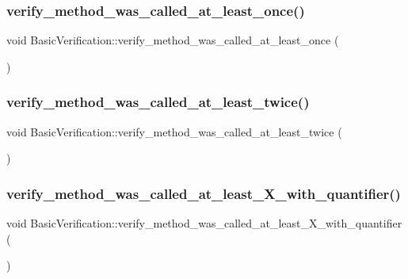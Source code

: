 \subsubsection{\texorpdfstring{verify\_method\_was\_called\_at\_least\_once()}{verify\_method\_was\_called\_at\_least\_once()}}
{\footnotesize\ttfamily void Basic\+Verification\+::verify\+\_\+method\+\_\+was\+\_\+called\+\_\+at\+\_\+least\+\_\+once (\begin{DoxyParamCaption}{ }\end{DoxyParamCaption})\hspace{0.3cm}{\ttfamily [inline]}}

\mbox{\label{structBasicVerification_af62788e316baa5f7d82bf87666fd7305}} 
\subsubsection{\texorpdfstring{verify\_method\_was\_called\_at\_least\_twice()}{verify\_method\_was\_called\_at\_least\_twice()}}
{\footnotesize\ttfamily void Basic\+Verification\+::verify\+\_\+method\+\_\+was\+\_\+called\+\_\+at\+\_\+least\+\_\+twice (\begin{DoxyParamCaption}{ }\end{DoxyParamCaption})\hspace{0.3cm}{\ttfamily [inline]}}

\mbox{\label{structBasicVerification_a96d45a82ee47900b0da6a435c3b41f9f}} 
\subsubsection{\texorpdfstring{verify\_method\_was\_called\_at\_least\_X\_with\_quantifier()}{verify\_method\_was\_called\_at\_least\_X\_with\_quantifier()}}
{\footnotesize\ttfamily void Basic\+Verification\+::verify\+\_\+method\+\_\+was\+\_\+called\+\_\+at\+\_\+least\+\_\+\+X\+\_\+with\+\_\+quantifier (\begin{DoxyParamCaption}{ }\end{DoxyParamCaption})\hspace{0.3cm}{\ttfamily [inline]}}

